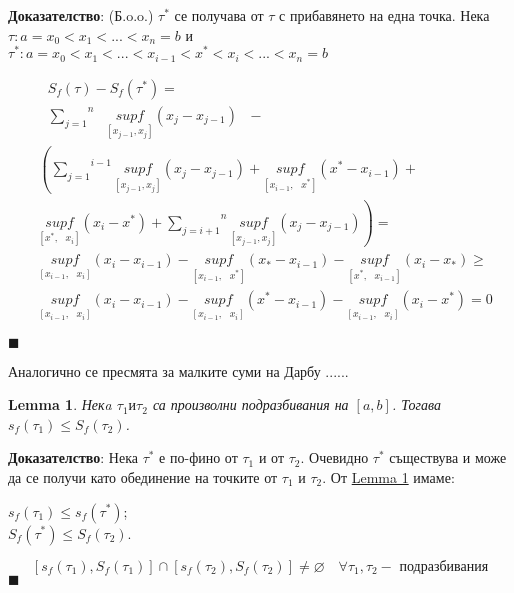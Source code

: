 \documentclass[12pt]{article}
\let\emptyset\varnothing
\newtheorem{lemma}{Lemma}
\newcommand{\suma}[2]{\overset{#2}{\underset{#1}{\sum}}}
\newcommand{\spc}{\text{ }}
\begin{document}
	\textbf{Доказателство}: (Б.o.o.) $\tau^{*}$ се получава от $\tau$ с прибавянето на една точка.
	Нека $\tau : a=x_{0}<x_{1}<...<x_{n}=b$ и
	$\tau^{*} : a=x_{0}<x_{1}<...<x_{i-1}<x^{*}<x_{i}<...<x_{n}=b$ 
	\newline
	
	\begin{equation*}
		\begin{aligned}
			&\spc S_{f}\left(\tau\right) - S_{f}\left(\tau^{*}\right) =
			\\
			&\spc\suma{j=1}{n}\spc\underset{\left[x_{j-1}, x_{j}\right]}{sup f} \left(x_{j} - x_{j-1}\right)\spc-
			\\
			&\left(
			\suma{j=1}{i-1}\underset{\left[x_{j-1}, x_{j}\right]}{sup f} \left(x_{j} - x_{j-1}\right) + 
			\underset{\left[x_{i-1},\spc x^{*}\right]}{sup f} \left(x^{*} - x_{i-1}\right) +
			\right. \\ &\left.
			\underset{\left[x^{*},\spc x_{i}\right]}{sup f} \left(x_{i} - x^{*}\right) +
			\suma{j=i+1}{n}\underset{\left[x_{j-1}, x_{j}\right]}{sup f} \left(x_{j} - x_{j-1}\right)
			\right) =
			\\
			&\underset{\left[x_{i-1},\spc x_{i}\right]}{sup f} \left(x_{i} - x_{i-1}\right) - 
			\underset{\left[x_{i-1},\spc x^{*}\right]}{sup f} \left(x_{*} - x_{i-1}\right) -
			\underset{\left[x^{*},\spc x_{i-1}\right]}{sup f} \left(x_{i} - x_{*}\right) \geq
			\\
			&\underset{\left[x_{i-1},\spc x_{i}\right]}{sup f} \left(x_{i} - x_{i-1}\right) - 
			\underset{\left[x_{i-1},\spc x_{i}\right]}{sup f} \left(x^{*} - x_{i-1}\right) -
			\underset{\left[x_{i-1},\spc x_{i}\right]}{sup f} \left(x_{i} - x^{*}\right) = 0 
		\end{aligned}
	\end{equation*}
	\begin{flushright}
		$\blacksquare$
	\end{flushright}
	Аналогично се пресмята за малките суми на Дарбу ......
	
	\begin{lemma}
		Некa $\tau_{1} и \tau_{2}$ са произволни подразбивания на $\left[a, b\right]$.\newline
		Тогава $s_{f}\left(\tau_{1}\right) \leq S_{f}\left(\tau_{2}\right)$.
	\end{lemma}
	\textbf{Доказателство}: Нека $\tau^{*}$ е по-фино от $\tau_{1}$ и от $\tau_{2}$. Очевидно $\tau^{*}$ съществува и може да се получи като обединение на точките от $\tau_{1}$ и $\tau_{2}$. От \underline{Lemma 1} 
	имаме:
	\begin{center}
		$s_{f}\left(\tau_{1}\right) \leq s_{f}\left(\tau^{*}\right)$; \\
		$S_{f}\left(\tau^{*}\right) \leq S_{f}\left(\tau_{2}\right)$.
	\end{center}
	\[[s_f(\tau_1),S_f(\tau_1)]\cap[s_f(\tau_2),S_f(\tau_2)]\neq\emptyset\quad \forall\tau_1,\tau_2 - \text{ подразбивания}\]\hfill $\blacksquare$\\
	
\end{document}
